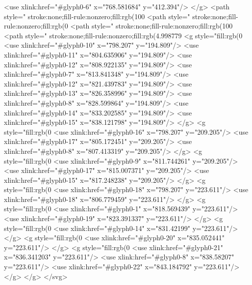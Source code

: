   <use xlink:href="#glyph0-6" x="768.581684" y="412.394"/>
</g>
<path style=" stroke:none;fill-rule:nonzero;fill:rgb(100%
<path style=" stroke:none;fill-rule:nonzero;fill:rgb(0%
<path style=" stroke:none;fill-rule:nonzero;fill:rgb(100%
<path style=" stroke:none;fill-rule:nonzero;fill:rgb(4.998779%
<g style="fill:rgb(0%
  <use xlink:href="#glyph0-10" x="798.207" y="194.809"/>
  <use xlink:href="#glyph0-11" x="804.635906" y="194.809"/>
  <use xlink:href="#glyph0-12" x="808.922135" y="194.809"/>
  <use xlink:href="#glyph0-7" x="813.841348" y="194.809"/>
  <use xlink:href="#glyph0-12" x="821.439783" y="194.809"/>
  <use xlink:href="#glyph0-13" x="826.358996" y="194.809"/>
  <use xlink:href="#glyph0-8" x="828.599864" y="194.809"/>
  <use xlink:href="#glyph0-14" x="833.202585" y="194.809"/>
  <use xlink:href="#glyph0-15" x="838.121798" y="194.809"/>
</g>
<g style="fill:rgb(0%
  <use xlink:href="#glyph0-16" x="798.207" y="209.205"/>
  <use xlink:href="#glyph0-17" x="805.172451" y="209.205"/>
  <use xlink:href="#glyph0-8" x="807.413319" y="209.205"/>
</g>
<g style="fill:rgb(0%
  <use xlink:href="#glyph0-9" x="811.744261" y="209.205"/>
  <use xlink:href="#glyph0-17" x="815.007371" y="209.205"/>
  <use xlink:href="#glyph0-15" x="817.248238" y="209.205"/>
</g>
<g style="fill:rgb(0%
  <use xlink:href="#glyph0-18" x="798.207" y="223.611"/>
  <use xlink:href="#glyph0-18" x="806.779459" y="223.611"/>
</g>
<g style="fill:rgb(0%
  <use xlink:href="#glyph0-1" x="818.569439" y="223.611"/>
  <use xlink:href="#glyph0-19" x="823.391337" y="223.611"/>
</g>
<g style="fill:rgb(0%
  <use xlink:href="#glyph0-14" x="831.42199" y="223.611"/>
</g>
<g style="fill:rgb(0%
  <use xlink:href="#glyph0-20" x="835.052441" y="223.611"/>
</g>
<g style="fill:rgb(0%
  <use xlink:href="#glyph0-21" x="836.341203" y="223.611"/>
  <use xlink:href="#glyph0-8" x="838.58207" y="223.611"/>
  <use xlink:href="#glyph0-22" x="843.184792" y="223.611"/>
</g>
</g>
</svg>

